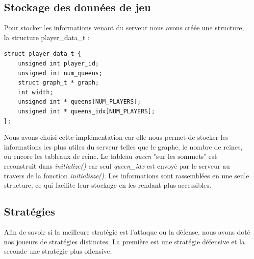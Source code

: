 \documentclass{article}
\begin{document}
\subsection{Stockage des données de jeu}
\label{playerdata}
Pour stocker les informations venant du serveur nous avons créée une structure, la structure player\_data\_t :

\begin{lstlisting}
struct player_data_t {
    unsigned int player_id;
    unsigned int num_queens;
    struct graph_t * graph;
    int width;
    unsigned int * queens[NUM_PLAYERS];
    unsigned int * queens_idx[NUM_PLAYERS];
};
\end{lstlisting}
\vspace{0.5cm}

\noindent Nous avons choisi cette implémentation car elle nous permet de stocker les informations les plus utiles du serveur telles que le graphe, le nombre de reines, ou encore les tableaux de reine. Le tableau \textit{queen} "sur les sommets" est reconstruit dans \textit{initialize()} car seul \textit{queen\_idx} est envoyé par le serveur au travers de la fonction \textit{initialisze()}. Les informations sont rassemblées en une seule structure, ce qui facilite leur stockage en les rendant plus accessibles.

\newpage
\subsection{Stratégies}
Afin de savoir si la meilleure stratégie est l'attaque ou la défense, nous avons doté nos joueurs de stratégies distinctes. La première est une stratégie défensive et la seconde une stratégie plus offensive.
\end{document}
